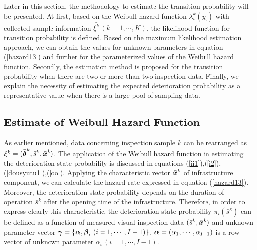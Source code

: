 Later in this section, the methodology to estimate the transition probability will be presented. At first, based on the Weibull hazard function $\lambda_i^k(y_i)$ with collected sample information $\bar{\xi^k}~(k=1,\cdots,K)$, the likelihood function for transition probability is defined. Based on the maximum likelihood estimation approach, we can obtain the values for unknown parameters in equation (\ref{hazard13}) and further for the parameterized values of the Weibull hazard function. Secondly, the estimation method is proposed for the transition probability when there are two or more than two inspection data. Finally, we explain the necessity of estimating the expected deterioration probability as a representative value when there is a large pool of sampling data.
\subsection{Estimate of Weibull Hazard Function}
\label{342}
As earlier mentioned, data concerning inspection sample $k$ can be rearranged as $\bar{\xi^k}=(\bar{\mbox{\boldmath$\delta$}}^k,\bar{s}^k,\bar{\mbox{\boldmath$x$}}^k)$. The application of the Weibull hazard function in estimating the deterioration state probability is discussed in equations  (\ref{ii1}),(\ref{i2}),(\ref{dousyutu1}),(\ref{oo}). Applying the characteristic vector $\bar{\mbox{\boldmath$x$}}^k$ of infrastructure component, we can calculate the hazard rate expressed in equation (\ref{hazard13}). Moreover, the deterioration state probability depends on the duration of operation $\bar{s}^k$ after the opening time of the infrastructure. Therefore, in order to express clearly this characteristic, the deterioration state probability $\pi_{i}(\bar{s}^k)$ can be defined as a function of measured visual inspection data $(\bar{s}^k,\bar{\mbox{\boldmath$x$}}^k)$ and unknown parameter vector $\mbox{\boldmath$\gamma$}=\{\mbox{\boldmath$\alpha$},\mbox{\boldmath$\beta$}_i~(i=1,\cdots,I-1)\}$. $\mbox{\boldmath$\alpha$}=(\alpha_{1},\cdots,\alpha_{I-1})$ is a row vector of unknown parameter $\alpha_{i}~(i=1,\cdots,I-1)$. 

